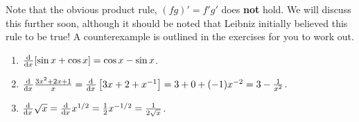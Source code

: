 Note that the obvious product rule, $ (fg)' = f'g' $ does \textbf{not} hold. We will discuss this further soon,
although it should be noted that Leibniz initially believed this rule to be true! A counterexample is outlined in the
exercises for you to work out.

\begin{exs}\leavevmode
  \begin{enumerate}
    \item $ \od{}{x} [\sin x + \cos x] = \cos x - \sin x $.
    \item $ \od{}{x} \frac{3x^2 + 2x + 1}{x} = \od{}{x} \left[ 3x + 2 + x^{-1} \right] = 3 + 0 + (-1)x^{-2} = 3 - \frac{1}{x^2} $.
    \item $ \od{}{x} \sqrt{x} = \od{}{x} x^{1/2} = \frac{1}{2}x^{-1/2} = \frac{1}{2\sqrt{x}} $.
  \end{enumerate}
\end{exs}

\clearpage
